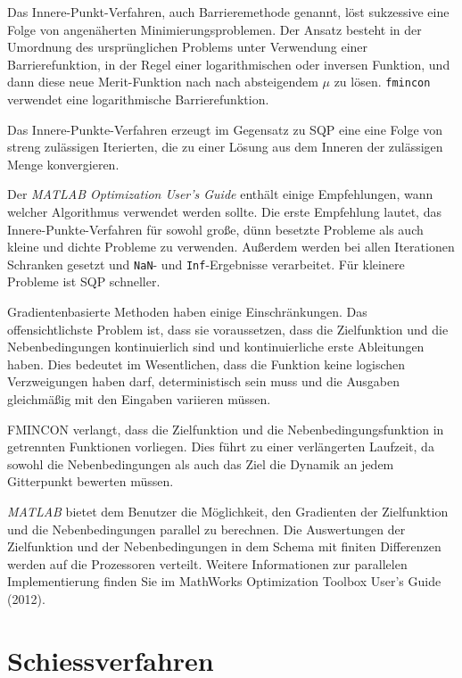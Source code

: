 Das Innere-Punkt-Verfahren, auch Barrieremethode genannt, löst sukzessive eine Folge von angenäherten Minimierungsproblemen. Der Ansatz besteht in der Umordnung des ursprünglichen Problems unter Verwendung einer Barrierefunktion, in der Regel einer logarithmischen oder inversen Funktion, und dann diese neue Merit-Funktion nach nach absteigendem $\mu$ zu lösen. \texttt{fmincon} verwendet eine logarithmische Barrierefunktion.

Das Innere-Punkte-Verfahren erzeugt im Gegensatz zu SQP eine eine Folge von streng zulässigen Iterierten, die zu einer Lösung aus dem Inneren der zulässigen Menge konvergieren.

Der \textit{MATLAB Optimization User's Guide} enthält einige Empfehlungen, wann welcher Algorithmus verwendet werden sollte. Die erste Empfehlung lautet, das Innere-Punkte-Verfahren für sowohl große, dünn besetzte Probleme als auch kleine und dichte Probleme zu verwenden. Außerdem werden bei allen Iterationen Schranken gesetzt und \texttt{NaN}- und \texttt{Inf}-Ergebnisse verarbeitet. Für kleinere Probleme ist SQP schneller.

Gradientenbasierte Methoden haben einige Einschränkungen. Das offensichtlichste Problem ist, dass sie voraussetzen, dass die Zielfunktion und die Nebenbedingungen kontinuierlich sind und kontinuierliche erste Ableitungen haben. Dies bedeutet im Wesentlichen, dass die Funktion keine logischen Verzweigungen haben darf, deterministisch sein muss und die Ausgaben gleichmäßig mit den Eingaben variieren müssen. 

FMINCON verlangt, dass die Zielfunktion und die Nebenbedingungsfunktion in getrennten Funktionen vorliegen. Dies führt zu einer verlängerten Laufzeit, da sowohl die Nebenbedingungen als auch das Ziel die Dynamik an jedem Gitterpunkt bewerten müssen.

\textit{MATLAB} bietet dem Benutzer die Möglichkeit, den Gradienten der Zielfunktion und die Nebenbedingungen parallel zu berechnen. Die Auswertungen der Zielfunktion und der Nebenbedingungen in dem Schema mit finiten Differenzen werden auf die Prozessoren verteilt. Weitere Informationen zur parallelen Implementierung finden Sie im MathWorks Optimization Toolbox User's Guide (2012).













\section{Schiessverfahren}

